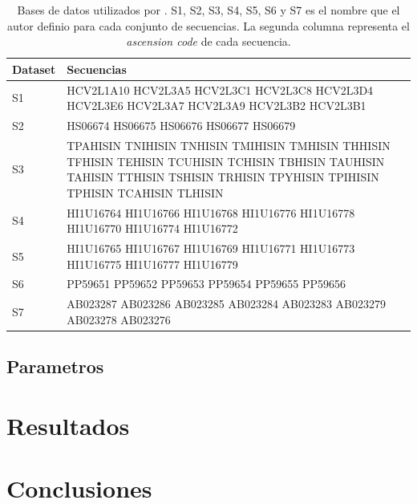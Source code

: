 \documentclass{cup-pan}
\begin{document}
	\begin{table}[h]
		\caption{Bases de datos utilizados por \citet{zablocki2009multiple}. S1, S2, S3, S4, S5, S6 y S7 es el nombre que el autor definio para cada conjunto de secuencias. La segunda columna representa el \textit{ascension code} de cada secuencia.}
		\begin{tabular}{lp{12cm}}

			\textbf{Dataset} & \textbf{Secuencias} \\
			\hline			
			S1	& HCV2L1A10 HCV2L3A5 HCV2L3C1 HCV2L3C8 HCV2L3D4 HCV2L3E6 HCV2L3A7 HCV2L3A9 HCV2L3B2  HCV2L3B1		\\				
			S2	& HS06674 HS06675 HS06676 HS06677 HS06679 \\
			S3  & TPAHISIN TNIHISIN TNHISIN TMIHISIN TMHISIN THHISIN TFHISIN TEHISIN TCUHISIN TCHISIN TBHISIN TAUHISIN TAHISIN TTHISIN TSHISIN TRHISIN TPYHISIN TPIHISIN TPHISIN TCAHISIN TLHISIN \\
			S4  & HI1U16764 HI1U16766 HI1U16768 HI1U16776 HI1U16778 HI1U16770	HI1U16774	HI1U16772 \\
			S5  & HI1U16765 HI1U16767 HI1U16769 HI1U16771 HI1U16773	HI1U16775 HI1U16777 HI1U16779 \\
			S6  & PP59651 PP59652 PP59653 PP59654 PP59655 PP59656 \\
			S7  & AB023287 AB023286 AB023285 AB023284 AB023283	AB023279 AB023278 AB023276 \\
			\hline 
		\end{tabular}
		
		\label{tab:datasets}
	\end{table}

	\subsection{Parametros}
	
	\section{Resultados}
	

		
	
	\section{Conclusiones}
	
	
	
	
	\clearpage
	
	\printbibliography
\end{document}
